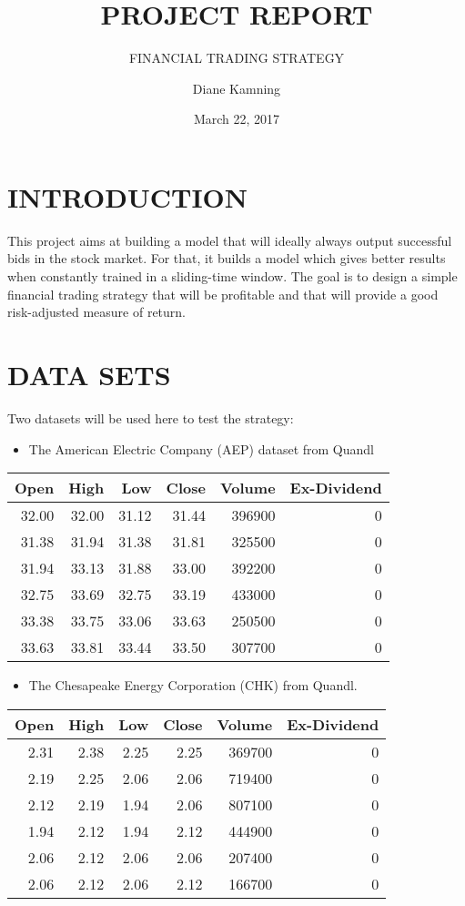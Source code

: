 \documentclass[12pt,]{article}
\title{PROJECT REPORT}
\subtitle{FINANCIAL TRADING STRATEGY}
\author{Diane Kamning}
\date{March 22, 2017}
\providecommand{\tightlist}{%
  \setlength{\itemsep}{0pt}\setlength{\parskip}{0pt}}
\begin{document}
\maketitle

{
\hypersetup{linkcolor=black}
\setcounter{tocdepth}{2}
\tableofcontents
}
\pagebreak

\section{INTRODUCTION}\label{introduction}

This project aims at building a model that will ideally always output
successful bids in the stock market. For that, it builds a model which
gives better results when constantly trained in a sliding-time window.
The goal is to design a simple financial trading strategy that will be
profitable and that will provide a good risk-adjusted measure of return.

\section{DATA SETS}\label{data-sets}

Two datasets will be used here to test the strategy:

\begin{itemize}
\tightlist
\item
  The American Electric Company (AEP) dataset from Quandl
\end{itemize}

\begin{longtable}[]{@{}rrrrrr@{}}
\toprule
Open & High & Low & Close & Volume & Ex-Dividend\tabularnewline
\midrule
\endhead
32.00 & 32.00 & 31.12 & 31.44 & 396900 & 0\tabularnewline
31.38 & 31.94 & 31.38 & 31.81 & 325500 & 0\tabularnewline
31.94 & 33.13 & 31.88 & 33.00 & 392200 & 0\tabularnewline
32.75 & 33.69 & 32.75 & 33.19 & 433000 & 0\tabularnewline
33.38 & 33.75 & 33.06 & 33.63 & 250500 & 0\tabularnewline
33.63 & 33.81 & 33.44 & 33.50 & 307700 & 0\tabularnewline
\bottomrule
\end{longtable}

\begin{itemize}
\tightlist
\item
  The Chesapeake Energy Corporation (CHK) from Quandl.
\end{itemize}

\begin{longtable}[]{@{}rrrrrr@{}}
\toprule
Open & High & Low & Close & Volume & Ex-Dividend\tabularnewline
\midrule
\endhead
2.31 & 2.38 & 2.25 & 2.25 & 369700 & 0\tabularnewline
2.19 & 2.25 & 2.06 & 2.06 & 719400 & 0\tabularnewline
2.12 & 2.19 & 1.94 & 2.06 & 807100 & 0\tabularnewline
1.94 & 2.12 & 1.94 & 2.12 & 444900 & 0\tabularnewline
2.06 & 2.12 & 2.06 & 2.06 & 207400 & 0\tabularnewline
2.06 & 2.12 & 2.06 & 2.12 & 166700 & 0\tabularnewline
\bottomrule
\end{longtable}
\end{document}
